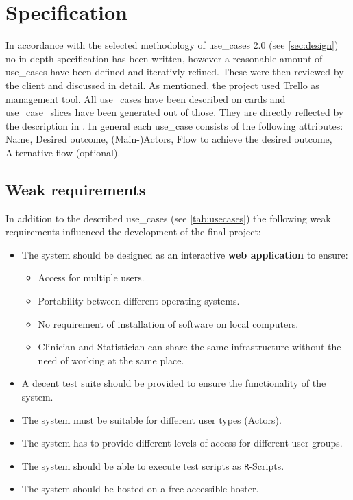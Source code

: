 \section{Specification}
\label{sec:specification}

In accordance with the selected methodology of \glspl{use_case} 2.0 (see \autoref{sec:design}) no in-depth specification has been written, however a reasonable amount of \glspl{use_case} have been defined and iterativly refined. These were then reviewed by the client and discussed in detail. As mentioned, the project used Trello as management tool. All \glspl{use_case} have been described on cards and \glspl{use_case_slice} have been generated out of those. They are directly reflected by the description in \cite{sassoon2014,sassoon2016, sassoon2016CD}. In general each \gls{use_case} consists of the following attributes: Name, Desired outcome, (Main-)\glspl{Actor}, Flow to achieve the desired outcome, Alternative flow (optional).


\subsection{Weak requirements}
In addition to the described \glspl{use_case} (see \autoref{tab:usecases}) the following weak requirements influenced the development of the final project:

\bigskip 

\begin{itemize}
	\item The system should be designed as an interactive \textbf{web application} to ensure:
	\begin{itemize}
		\item Access for multiple users.
		\item Portability between different operating systems.
		\item No requirement of installation of software on local computers.
		\item Clinician and Statistician can share the same infrastructure without the need of working at the same place.
	\end{itemize}
	\item A decent test suite should be provided to ensure the functionality of the system.
	\item The system must be suitable for different user types (\glspl{Actor}).
	\item The system has to provide different levels of access for different user groups.
	\item The system should be able to execute test scripts as \texttt{R}-Scripts.
	\item The system should be hosted on a free accessible hoster.
\end{itemize}


